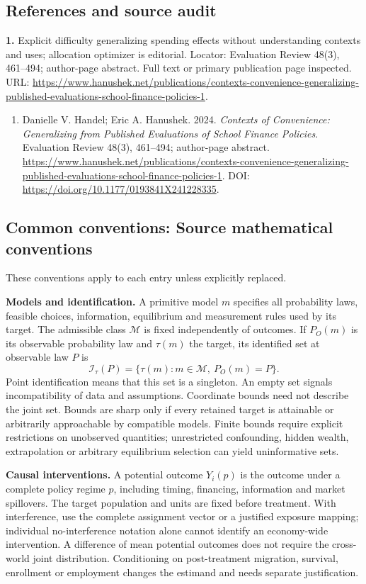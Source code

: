 \documentclass[11pt,a4paper]{article}
\begin{document}
\subsection*{References and source audit}
\textbf{1.} Explicit difficulty generalizing spending effects without understanding contexts and uses; allocation optimizer is editorial. Locator: Evaluation Review 48(3), 461–494; author-page abstract. Full text or primary publication page inspected. URL: \url{https://www.hanushek.net/publications/contexts-convenience-generalizing-published-evaluations-school-finance-policies-1}.
\begin{enumerate}\raggedright
\item\hypertarget{definitions:source:30007734:1}{} Danielle V. Handel; Eric A. Hanushek. 2024. \emph{Contexts of Convenience: Generalizing from Published Evaluations of School Finance Policies}. Evaluation Review 48(3), 461–494; author-page abstract.
\url{https://www.hanushek.net/publications/contexts-convenience-generalizing-published-evaluations-school-finance-policies-1}.
DOI: \url{https://doi.org/10.1177/0193841X241228335}.
\end{enumerate}

\subsection*{Common conventions: Source mathematical conventions}

These conventions apply to each entry unless explicitly replaced.

\textbf{Models and identification.} A primitive model \(m\) specifies all probability laws, feasible choices, information, equilibrium and measurement rules used by its target. The admissible class \(\mathcal M\) is fixed independently of outcomes. If \(P_O(m)\) is its observable probability law and \(\tau(m)\) the target, its identified set at observable law \(P\) is
\[
 \mathcal I_\tau(P)=\{\tau(m):m\in\mathcal M,\ P_O(m)=P\}.
\]
Point identification means that this set is a singleton. An empty set signals incompatibility of data and assumptions. Coordinate bounds need not describe the joint set. Bounds are sharp only if every retained target is attainable or arbitrarily approachable by compatible models. Finite bounds require explicit restrictions on unobserved quantities; unrestricted confounding, hidden wealth, extrapolation or arbitrary equilibrium selection can yield uninformative sets.

\textbf{Causal interventions.} A potential outcome \(Y_i(p)\) is the outcome under a complete policy regime \(p\), including timing, financing, information and market spillovers. The target population and units are fixed before treatment. With interference, use the complete assignment vector or a justified exposure mapping; individual no-interference notation alone cannot identify an economy-wide intervention. A difference of mean potential outcomes does not require the cross-world joint distribution. Conditioning on post-treatment migration, survival, enrollment or employment changes the estimand and needs separate justification.
\end{document}

